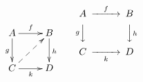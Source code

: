 \documentclass{article}
\begin{document}
\[
\xymatrix{
  A \ar[r]^{f} \ar[d]_{g} & B \ar[d]^{h} \\
  C \ar[r]_{k} \ar@{-->}[ur] & D
}
\qquad
\begin{CD}
  A @>f>> B \\
  @VgVV @VVhV \\
  C @>>k> D
\end{CD}
\]
\end{document}
